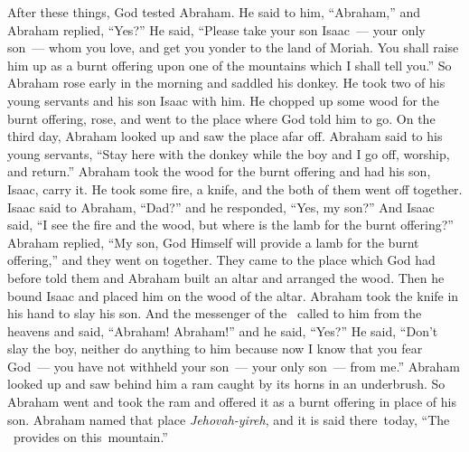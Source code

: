 
\begin{inparaenum}
   After these things, God tested Abraham. He said to him, ``Abraham,'' and Abraham replied, ``Yes?''%
   He said, ``Please take your son Isaac~--- your only son~--- whom you love, and get you yonder to the land of Moriah. You shall raise him up as a burnt offering upon one of the mountains which I shall tell you.''%
   So Abraham rose early in the morning and saddled his donkey. He took two of his young servants and his son Isaac with him. He chopped up some wood for the burnt offering, rose, and went to the place where God told him to go.%
   On the third day, Abraham looked up and saw the place afar off.%
   Abraham said to his young servants, ``Stay here with the donkey while the boy and I go off, worship, and return.''%
   Abraham took the wood for the burnt offering and had his son, Isaac, carry it. He took some fire, a knife, and the both of them went off together.%
   Isaac said to Abraham, ``Dad?'' and he responded, ``Yes, my son?'' And Isaac said, ``I see the fire and the wood, but where is the lamb for the burnt offering?''%
   Abraham replied, ``My son, God Himself will provide a lamb for the burnt offering,'' and they went on together.%
   They came to the place which God had before told them and Abraham built an altar and arranged the wood. Then he bound Isaac and placed him on the wood of the altar.%
   Abraham took the knife in his hand to slay his son.%
   And the messenger of the \lord\ called to him from the heavens and said, ``Abraham! Abraham!'' and he said, ``Yes?''%
   He said, ``Don't slay the boy, neither do anything to him because now I know that you fear God~--- you have not withheld your son~--- your only son~--- from me.''%
   Abraham looked up and saw behind him a ram caught by its horns in an underbrush. So Abraham went and took the ram and offered it as a burnt offering in place of his son.%
   Abraham named that place \textit{Jehovah-yireh}, and it is said there\understood\ today, ``The \lord\ provides on this\understood\ mountain.''%

\end{inparaenum}
